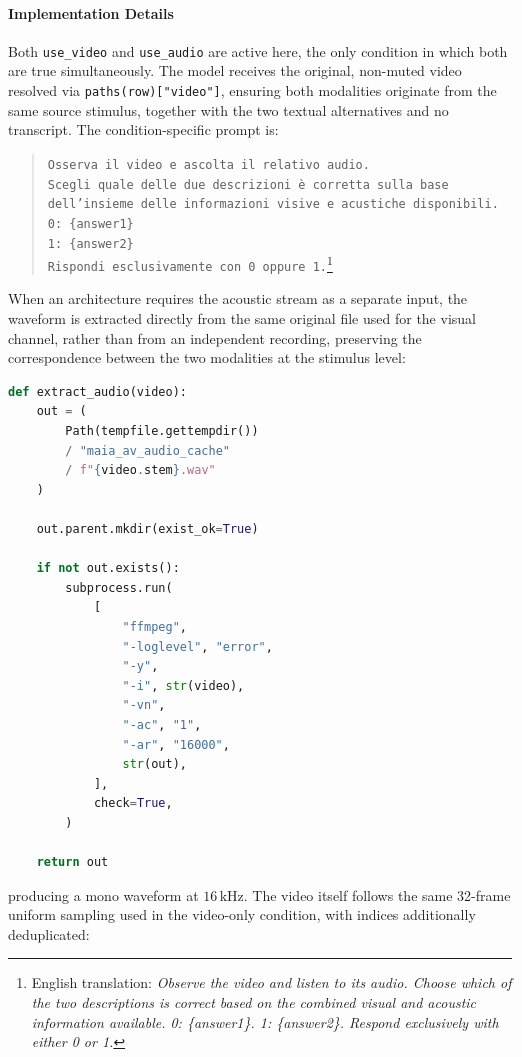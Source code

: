 \paragraph{Implementation Details}
Both \texttt{use\_video} and \texttt{use\_audio} are active here, the only condition in which both are true simultaneously. The model receives the original, non-muted video resolved via \texttt{paths(row)["video"]}, ensuring both modalities originate from the same source stimulus, together with the two textual alternatives and no transcript. The condition-specific prompt is:
\begin{quote}
\small
\texttt{Osserva il video e ascolta il relativo audio.}\\
\texttt{Scegli quale delle due descrizioni è corretta sulla base}\\
\texttt{dell'insieme delle informazioni visive e acustiche disponibili.}\\[0.5em]
\texttt{0: \{answer1\}}\\
\texttt{1: \{answer2\}}\\[0.5em]
\texttt{Rispondi esclusivamente con 0 oppure 1.}\footnote{English translation: \textit{Observe the video and listen to its audio. Choose which of the two descriptions is correct based on the combined visual and acoustic information available. 0: \{answer1\}. 1: \{answer2\}. Respond exclusively with either 0 or 1.}}
\end{quote}
When an architecture requires the acoustic stream as a separate input, the waveform is extracted directly from the same original file used for the visual channel, rather than from an independent recording, preserving the correspondence between the two modalities at the stimulus level:
\begin{lstlisting}[language=Python]
def extract_audio(video):
    out = (
        Path(tempfile.gettempdir())
        / "maia_av_audio_cache"
        / f"{video.stem}.wav"
    )

    out.parent.mkdir(exist_ok=True)

    if not out.exists():
        subprocess.run(
            [
                "ffmpeg",
                "-loglevel", "error",
                "-y",
                "-i", str(video),
                "-vn",
                "-ac", "1",
                "-ar", "16000",
                str(out),
            ],
            check=True,
        )

    return out
\end{lstlisting}
producing a mono waveform at \(16\,\mathrm{kHz}\). The video itself follows the same 32-frame uniform sampling used in the video-only condition, with indices additionally deduplicated:
